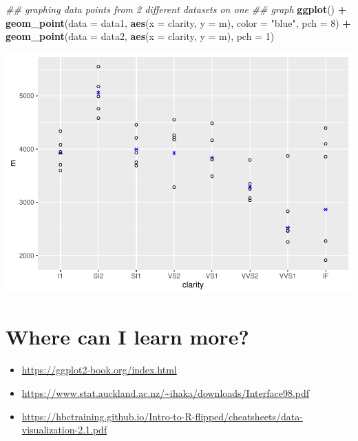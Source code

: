 \documentclass[
]{book}
\newenvironment{Shaded}{\begin{snugshade}}{\end{snugshade}}
\newcommand{\CommentTok}[1]{\textcolor[rgb]{0.56,0.35,0.01}{\textit{#1}}}
\newcommand{\DataTypeTok}[1]{\textcolor[rgb]{0.13,0.29,0.53}{#1}}
\newcommand{\DecValTok}[1]{\textcolor[rgb]{0.00,0.00,0.81}{#1}}
\newcommand{\KeywordTok}[1]{\textcolor[rgb]{0.13,0.29,0.53}{\textbf{#1}}}
\newcommand{\NormalTok}[1]{#1}
\newcommand{\OperatorTok}[1]{\textcolor[rgb]{0.81,0.36,0.00}{\textbf{#1}}}
\newcommand{\StringTok}[1]{\textcolor[rgb]{0.31,0.60,0.02}{#1}}
\begin{document}
\begin{Shaded}
\begin{Highlighting}[]
\CommentTok{## graphing data points from 2 different datasets on one}
\CommentTok{## graph}
\KeywordTok{ggplot}\NormalTok{() }\OperatorTok{+}\StringTok{ }\KeywordTok{geom_point}\NormalTok{(}\DataTypeTok{data =}\NormalTok{ data1, }\KeywordTok{aes}\NormalTok{(}\DataTypeTok{x =}\NormalTok{ clarity, }\DataTypeTok{y =}\NormalTok{ m),}
    \DataTypeTok{color =} \StringTok{"blue"}\NormalTok{, }\DataTypeTok{pch =} \DecValTok{8}\NormalTok{) }\OperatorTok{+}\StringTok{ }\KeywordTok{geom_point}\NormalTok{(}\DataTypeTok{data =}\NormalTok{ data2, }\KeywordTok{aes}\NormalTok{(}\DataTypeTok{x =}\NormalTok{ clarity,}
    \DataTypeTok{y =}\NormalTok{ m), }\DataTypeTok{pch =} \DecValTok{1}\NormalTok{)}
\end{Highlighting}
\end{Shaded}

\includegraphics{_main_files/figure-latex/unnamed-chunk-319-8.pdf}

\hypertarget{where-can-i-learn-more}{%
\section{Where can I learn more?}\label{where-can-i-learn-more}}

\begin{itemize}
\item
  \url{https://ggplot2-book.org/index.html}
\item
  \url{https://www.stat.auckland.ac.nz/~ihaka/downloads/Interface98.pdf}
\item
  \url{https://hbctraining.github.io/Intro-to-R-flipped/cheatsheets/data-visualization-2.1.pdf}
\end{itemize}
\end{document}
